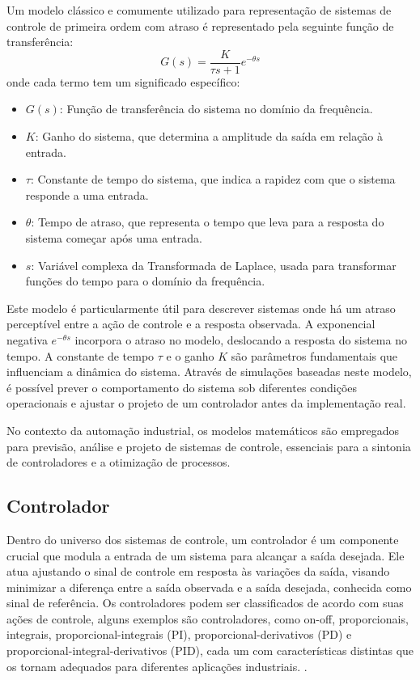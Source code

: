 Um modelo clássico e comumente utilizado para representação de sistemas de controle de primeira ordem com atraso é
representado pela seguinte função de transferência:
\begin{equation}
\label{eq:firstordertf}
G(s) = \frac{K}{\tau s + 1}e^{-\theta s}
\end{equation}
onde cada termo tem um significado específico:
\begin{itemize}
\item $G(s)$: Função de transferência do sistema no domínio da frequência.
\item $K$: Ganho do sistema, que determina a amplitude da saída em relação à entrada.
\item $\tau$: Constante de tempo do sistema, que indica a rapidez com que o sistema responde a uma entrada.
\item $\theta$: Tempo de atraso, que representa o tempo que leva para a resposta do sistema começar após uma entrada.
\item $s$: Variável complexa da Transformada de Laplace, usada para transformar funções do tempo para o domínio da frequência.
\end{itemize}

Este modelo é particularmente útil para descrever sistemas onde há um atraso perceptível entre a ação de controle e a
resposta observada.
A exponencial negativa \( e^{-\theta s} \) incorpora o atraso no modelo, deslocando a resposta do sistema no tempo.
A constante de tempo \( \tau \) e o ganho \( K \) são parâmetros fundamentais que influenciam a dinâmica do sistema.
Através de simulações baseadas neste modelo, é possível prever o comportamento do sistema sob diferentes
condições operacionais e ajustar o projeto de um controlador antes da implementação real.

No contexto da automação industrial, os modelos matemáticos são empregados para previsão, análise e projeto de sistemas
de controle, essenciais para a sintonia de controladores e a otimização de processos.

\subsection{Controlador}

Dentro do universo dos sistemas de controle, um controlador é um componente crucial que modula a entrada de um sistema
para alcançar a saída desejada.
Ele atua ajustando o sinal de controle em resposta às variações da saída, visando minimizar a diferença entre a saída
observada e a saída desejada, conhecida como sinal de referência.
Os controladores podem ser classificados de acordo com suas ações de controle, alguns exemplos são controladores,
como on-off, proporcionais, integrais, proporcional-integrais (PI), proporcional-derivativos (PD) e
proporcional-integral-derivativos (PID), cada um com características distintas que os tornam adequados para diferentes
aplicações industriais. \cite[Cap 2.3]{ogata2010engenharia}.

